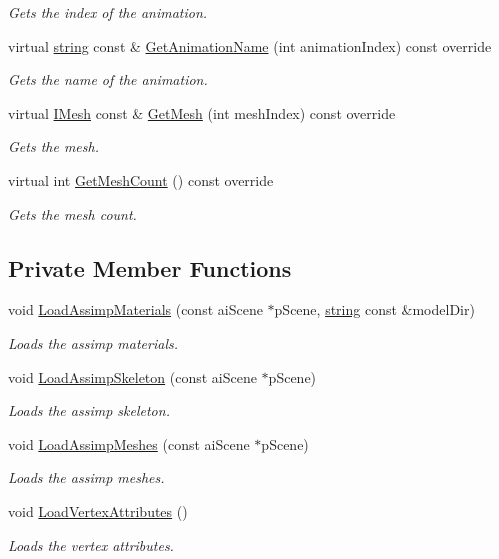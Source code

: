 \begin{DoxyCompactItemize}
\begin{DoxyCompactList}\small\item\em Gets the index of the animation. \end{DoxyCompactList}\item 
virtual \hyperlink{_types_8h_ad453f9f71ce1f9153fb748d6bb25e454}{string} const \& \hyperlink{class_model_a415e5443700a904eb50dab755c3681fc}{Get\+Animation\+Name} (int animation\+Index) const  override
\begin{DoxyCompactList}\small\item\em Gets the name of the animation. \end{DoxyCompactList}\item 
virtual \hyperlink{class_i_mesh}{I\+Mesh} const \& \hyperlink{class_model_a0734ce48bc8e28cdc3853cad7610b9c7}{Get\+Mesh} (int mesh\+Index) const  override
\begin{DoxyCompactList}\small\item\em Gets the mesh. \end{DoxyCompactList}\item 
virtual int \hyperlink{class_model_a82eaeee2c42d9aa32980853a13a44157}{Get\+Mesh\+Count} () const  override
\begin{DoxyCompactList}\small\item\em Gets the mesh count. \end{DoxyCompactList}\end{DoxyCompactItemize}
\subsection*{Private Member Functions}
\begin{DoxyCompactItemize}
\item 
void \hyperlink{class_model_aad522a066f0ff83386224f9e4b9f839a}{Load\+Assimp\+Materials} (const ai\+Scene $\ast$p\+Scene, \hyperlink{_types_8h_ad453f9f71ce1f9153fb748d6bb25e454}{string} const \&model\+Dir)
\begin{DoxyCompactList}\small\item\em Loads the assimp materials. \end{DoxyCompactList}\item 
void \hyperlink{class_model_a694937ff39bfa5fc570a17911ebad663}{Load\+Assimp\+Skeleton} (const ai\+Scene $\ast$p\+Scene)
\begin{DoxyCompactList}\small\item\em Loads the assimp skeleton. \end{DoxyCompactList}\item 
void \hyperlink{class_model_a473f1ba420d4c80c7691924a00f41550}{Load\+Assimp\+Meshes} (const ai\+Scene $\ast$p\+Scene)
\begin{DoxyCompactList}\small\item\em Loads the assimp meshes. \end{DoxyCompactList}\item 
void \hyperlink{class_model_a16116c10d24e886acf1dcb44718695ea}{Load\+Vertex\+Attributes} ()
\begin{DoxyCompactList}\small\item\em Loads the vertex attributes. \end{DoxyCompactList}\end{DoxyCompactItemize}
